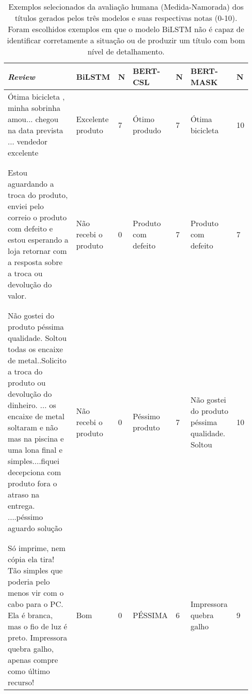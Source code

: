 \documentclass{article}
\begin{document}
\begin{table}
\centering

\begin{tabular}{p{4cm}llllp{3.5cm}l}
\toprule
\textit{Review} & BiLSTM & N & BERT-CSL & N & BERT-MASK & N \\ \midrule

\parbox{4cm}{Ótima bicicleta , minha sobrinha amou... chegou na data prevista ... vendedor excelente} & Excelente produto & 7  & Ótimo produdo & 7 & Ótima bicicleta & 10 \\

\\  \\

\parbox{4cm}{Estou aguardando a troca do produto, enviei pelo correio o produto com defeito e estou esperando a loja retornar com a resposta sobre a troca ou devolução do valor.} & Não recebi o produto & 0 & Produto com defeito & 7 & Produto com defeito & 7 \\

\\ \\

\parbox{4cm}{Não gostei do produto péssima qualidade. Soltou todas os encaixe de metal..Solicito a troca do produto ou devolução do dinheiro. ... os encaixe de metal soltaram e não mas na piscina e uma lona final e simples....fiquei decepciona com produto fora o atraso na entrega. ....péssimo aguardo solução} & Não recebi o produto & 0 & Péssimo produto & 7 & Não gostei do produto péssima qualidade. Soltou & 10 \\

\\  \\

\parbox{4cm}{Só imprime, nem cópia ela tira! Tão simples que poderia pelo menos vir com o cabo para o PC. Ela é branca, mas o fio de luz é preto. Impressora quebra galho, apenas compre como último recurso!} & Bom & 0 & PÉSSIMA & 6 & Impressora quebra galho & 9

\\ \bottomrule

\end{tabular}
\caption{Exemplos selecionados da avaliação humana (Medida-Namorada) dos títulos gerados pelos três modelos e suas respectivas notas (0-10). Foram escolhidos exemplos em que o modelo BiLSTM não é capaz de identificar corretamente a situação ou de produzir um título com bom nível de detalhamento.} 
\label{exemplos}
\end{table}

\printbibliography
\end{document}
